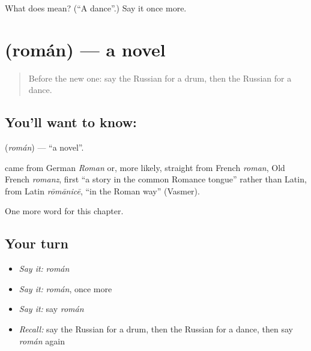 \begin{tcolorbox}[breakable,colback=teal!4,colframe=teal!35!black,title={Before you move on}]
What does  mean? (\textquotedblleft{}A dance\textquotedblright{}.) Say it once more.
\end{tcolorbox}
\section[\texorpdfstring{\ru{роман} (román)}{роман (román)}]{ (román) — a novel}

\label{lesson:RU-C226-roman}



\begin{quote}
Before the new one: say the Russian for a drum, then the Russian for a dance.
\end{quote}

\subsection*{You'll want to know: }
\textbf{} (\emph{román}) — \textquotedblleft{}a novel\textquotedblright{}.

\begin{cousinweb}
\textbf{} came from German \emph{Roman} or, more likely, straight from French \emph{roman}, Old French \emph{romanz}, first \textquotedblleft{}a story in the common Romance tongue\textquotedblright{} rather than Latin, from Latin \emph{rōmānicē}, \textquotedblleft{}in the Roman way\textquotedblright{} (Vasmer).
\end{cousinweb}

\begin{grammarlens}[title={What you've built}]
One more word for this chapter.
\end{grammarlens}

\subsection*{Your turn}
\begin{itemize}
\raggedright
  \item \emph{Say it:} \emph{román}
  \item \emph{Say it:} \emph{román}, once more
  \item \emph{Say it:} say \emph{román}
  \item \emph{Recall:} say the Russian for a drum, then the Russian for a dance, then say \emph{román} again
\end{itemize}

